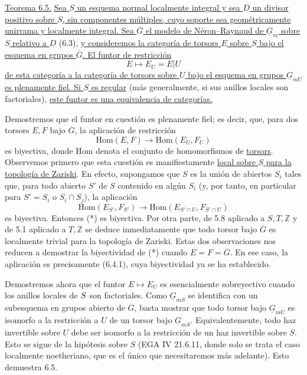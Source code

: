 
\medskip
\noindent\underline{Teorema 6.5.} \underline{Sea $S$ un esquema
normal localmente integral y sea $D$ un divisor positivo sobre $S$,
sin componentes múltiples, cuyo soporte sea geométricamente unirrama y
localmente integral. Sea $\overline G$ el modelo de Néron--Raynaud de
$\underline G_m$ sobre $S$ relativo a $D$} (6.3), \underline{y
consideremos la categoría de torsors $E$ sobre $S$ bajo el esquema en
grupos $\overline G$. El funtor de restricción}
\[
 E\longmapsto E_U=E|U
\]
\underline{de esta categoría a la categoría de torsors sobre $U$ bajo
el esquema en grupos $\underline G_{mU}$ es plenamente fiel. Si $S$ es
regular} (más generalmente, si sus anillos locales son factoriales),
\underline{este funtor es una equivalencia de categorías.}


Demostremos que el funtor en cuestión es plenamente fiel; es decir,
que, para dos torsors $E,F$ bajo $\overline G$, la aplicación de
restricción
\begin{equation}\tag{*}
 \mathrm{Hom}(E,F)\longrightarrow\mathrm{Hom}(E_U,F_U)
\end{equation}
es biyectiva, donde $\mathrm{Hom}$ denota el conjunto de homomorfismos
de \underline{torsors}. Observemos primero que esta cuestión es
manifiestamente \underline{local sobre $S$ para la topología de
Zariski}. En efecto, supongamos que $S$ es la unión de abiertos $S_i$
tales que, para todo abierto $S'$ de $S$ contenido en algún $S_i$ (y,
por tanto, en particular para $S'=S_i$ o $S_i\cap S_j$), la aplicación
\[
 \mathrm{Hom}(E_{S'},F_{S'})
 \longrightarrow
 \mathrm{Hom}(E_{S'\cap U},F_{S'\cap U})
\]
es biyectiva. Entonces (*) es biyectiva. Por otra parte, de 5.8
aplicado a $S,T,\mathbb Z$ y de 5.1 aplicado a $T,\mathbb Z$ se deduce
inmediatamente que todo torsor bajo $\overline G$ es localmente trivial
para la topología de Zariski. Estas dos observaciones nos reducen a
demostrar la biyectividad de (*) cuando $E=F=\overline G$. En ese caso,
la aplicación es precisamente (6.4.1), cuya biyectividad ya se ha
establecido.

Demostremos ahora que el funtor $E\mapsto E_U$ es esencialmente
sobreyectivo cuando los anillos locales de $\sisi{X}{S}$ son
factoriales. Como $\underline G_{mS}$ se identifica con un subesquema
en grupos abierto de $\overline G$, basta mostrar que todo torsor bajo
$\underline G_{mU}$ es isomorfo a la restricción a $U$ de un torsor
bajo $\underline G_{mS}$. Equivalentemente, todo haz invertible sobre
$U$ debe ser isomorfo a la restricción de un haz invertible sobre $S$.
Esto se sigue de la hipótesis sobre $S$ (EGA IV 21.6.11, donde solo se
trata el caso localmente noetheriano, que es el único que necesitaremos
más adelante). Esto demuestra 6.5.


